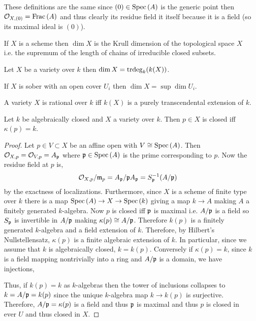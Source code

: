 \documentclass[12pt]{article}
\begin{document}
\begin{remark}
These definitions are the same since $(0) \in \mathrm{Spec}\left( A \right)$ is the generic point then $\mathcal{O}_{X, (0)} = \mathrm{Frac}\left(A\right)$ and thus clearly its residue field it itself because it is a field (so its maximal ideal is $(0)$). 
\end{remark}

\begin{definition}
If $X$ is a scheme then $\dim{X}$ is the Krull dimension of the topological space $X$ i.e. the supremum of the length of chains of irreducible closed subsets. 
\end{definition}

\begin{proposition}
Let $X$ be a variety over $k$ then $\dim{X} = \mathrm{trdeg}_{k}(k(X))$. 
\end{proposition}

\begin{proposition}
If $X$ is sober with an open cover $U_i$ then $\dim{X} = \sup{\dim{U_i}}$. 
\end{proposition}

\begin{definition}
A variety $X$ is rational over $k$ iff $k(X)$ is a purely transcendental extension of $k$. 
\end{definition}

\begin{proposition}
Let $k$ be algebraically closed and $X$ a variety over $k$. Then $p \in X$ is closed iff $\kappa(p) = k$.
\end{proposition}

\begin{proof}
Let $p \in V \subset X$ be an affine open with $V \cong \mathrm{Spec}\left( A \right)$. Then $\mathcal{O}_{X, p} = \mathcal{O}_{V, p} = A_{\mathfrak{p}}$ where $\mathfrak{p} \in \mathrm{Spec}\left( A \right)$ is the prime corresponding to $p$. Now the residue field at $p$ is, 
\[ \mathcal{O}_{X, p} / \mathfrak{m}_p = A_{\mathfrak{p}} / \mathfrak{p} A_{\mathfrak{p}} = S_{\mathfrak{p}}^{-1} ( A / \mathfrak{p} ) \]
by the exactness of localizations. Furthermore, since $X$ is a scheme of finite type over $k$ there is a map $\mathrm{Spec}\left( A \right) \to X \to \mathrm{Spec}\left( k \right)$ giving a map $k \to A$ making $A$ a finitely generated $k$-algebra. Now $p$ is closed iff $\mathfrak{p}$ is maximal i.e. $A / \mathfrak{p}$ is a field so $S_{\mathfrak{p}}$ is invertible in $A / \mathfrak{p}$ making $\kappa(p) \cong A / \mathfrak{p}$. Therefore $k(p)$ is a finitely generated $k$-algebra and a field extension of $k$. Therefore, by Hilbert's Nullstellensatz, $\kappa(p)$ is a finite algebraic extension of $k$. In particular, since we assume that $k$ is algebraically closed, $k = k(p)$. Conversely if $\kappa(p) = k$, since $k$ is a field mapping nontrivially into a ring and $A / \mathfrak{p}$ is a domain, we have injections,
\begin{center}
\end{center}
Thus, if $k(p) = k$ as $k$-algebras then the tower of inclusions collapses to $k = A / \mathfrak{p} = k(p)$ since the unique $k$-algebra map $k \to k(p)$ is surjective. Therefore, $A / \mathfrak{p} = \kappa(p)$ is a field and thus $\mathfrak{p}$ is maximal and thus $p$ is closed in ever $U$ and thus closed in $X$.   
\end{proof}
\end{document}
